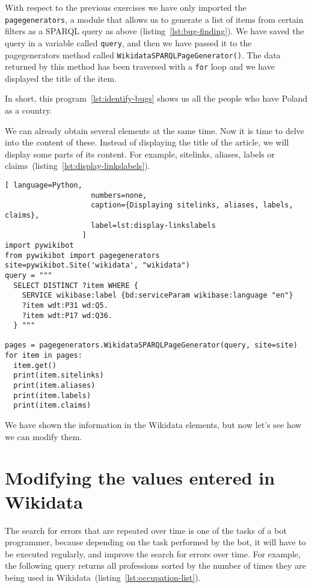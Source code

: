 With respect to the previous exercises we have only imported the \lstinline|pagegenerators|, a module that allows us to generate a list of items from certain filters as a SPARQL query as above (listing~\ref{lst:bug-finding}). 
We have saved the query in a variable called \lstinline|query|, 
and then we have passed it to the pagegenerators method called \lstinline|WikidataSPARQLPageGenerator()|. 
The data returned by this method has been traversed with a \lstinline|for| loop and we have displayed the title of the item.

In short, this program~\ref{lst:identify-bugs} shows us all the people who have Poland as a country.

We can already obtain several elements at the same time. Now it is time to delve into the content of these. Instead of displaying the title of the article, we will display some parts of its content. For example, sitelinks, aliases, labels or claims~(listing~\ref{lst:display-linkslabels}).

\begin{lstlisting}[ language=Python,
                    numbers=none,
                    caption={Displaying sitelinks, aliases, labels, claims},
                    label=lst:display-linkslabels
                  ]
import pywikibot
from pywikibot import pagegenerators
site=pywikibot.Site('wikidata', "wikidata")
query = """
  SELECT DISTINCT ?item WHERE {
    SERVICE wikibase:label {bd:serviceParam wikibase:language "en"}
    ?item wdt:P31 wd:Q5.
    ?item wdt:P17 wd:Q36.
  } """

pages = pagegenerators.WikidataSPARQLPageGenerator(query, site=site)
for item in pages:
  item.get()
  print(item.sitelinks)
  print(item.aliases)
  print(item.labels)
  print(item.claims)
\end{lstlisting} 


We have shown the information in the Wikidata elements, but now let's see how we can modify them. 

\section{Modifying the values entered in Wikidata}
\label{sec:modifying the values entered in Wikidata eng}

The search for errors that are repeated over time is one of the tasks of a bot programmer, 
because depending on the task performed by the bot, 
it will have to be executed regularly, 
and improve the search for errors over time. 
For example, the following query returns all professions sorted by the number of times 
they are being used in Wikidata~(listing~\ref{lst:occupation-list}).

